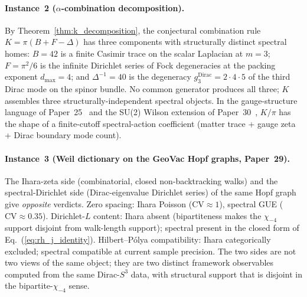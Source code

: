 \documentclass[aps,pra,twocolumn,superscriptaddress,longbibliography]{revtex4-2}
\begin{document}
\paragraph{Instance~2 ($\alpha$-combination decomposition).}  By
Theorem~\ref{thm:k_decomposition}, the conjectural combination rule
$K = \pi(B + F - \Delta)$ has three components with structurally
distinct spectral homes: $B = 42$ is a finite Casimir trace on the
scalar Laplacian at $m = 3$; $F = \pi^2/6$ is the infinite Dirichlet
series of Fock degeneracies at the packing exponent
$d_{\max} = 4$; and $\Delta^{-1} = 40$ is the degeneracy
$g_3^{\mathrm{Dirac}} = 2 \cdot 4 \cdot 5$ of the third Dirac mode on
the spinor bundle.  No common generator produces all three; $K$
assembles three structurally-independent spectral objects.  In the
gauge-structure language of Paper~25~\cite{loutey_paper25} and the
SU(2) Wilson extension of Paper~30~\cite{loutey_paper30}, $K/\pi$
has the shape of a finite-cutoff spectral-action coefficient
(matter trace + gauge zeta + Dirac boundary mode count).

\paragraph{Instance~3 (Weil dictionary on the GeoVac Hopf graphs,
Paper~29).}  The Ihara-zeta side (combinatorial, closed
non-backtracking walks) and the spectral-Dirichlet side
(Dirac-eigenvalue Dirichlet series) of the same
Hopf graph~\cite{loutey_paper29} give \emph{opposite} verdicts.
Zero spacing: Ihara Poisson ($\mathrm{CV} \approx 1$), spectral
GUE ($\mathrm{CV} \approx 0.35$).  Dirichlet-$L$ content: Ihara
absent (bipartiteness makes the $\chi_{-4}$ support disjoint from
walk-length support); spectral present in the closed form of
Eq.~(\ref{eq:rh_j_identity}).  Hilbert--P\'olya compatibility:
Ihara categorically excluded; spectral compatible at current sample
precision.  The two sides are not two views of the same object;
they are two distinct framework observables computed from the
same Dirac-$S^3$ data, with structural support that is disjoint
in the bipartite-$\chi_{-4}$ sense.
\end{document}
